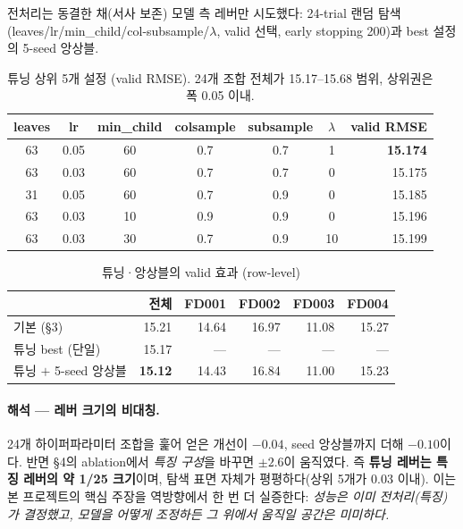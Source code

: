 \documentclass[11pt]{article}
\begin{document}
전처리는 동결한 채(서사 보존) 모델 측 레버만 시도했다:
24-trial 랜덤 탐색(leaves/lr/min\_child/col-subsample/$\lambda$, valid 선택, early stopping 200)과 best 설정의 5-seed 앙상블.

\begin{table}[H]
\centering
\caption{튜닝 상위 5개 설정 (valid RMSE). 24개 조합 전체가 15.17--15.68 범위, 상위권은 폭 0.05 이내.}
\label{tab:tune}
\begin{tabular}{cccccc r}
\toprule
leaves & lr & min\_child & colsample & subsample & $\lambda$ & valid RMSE \\
\midrule
63 & 0.05 & 60 & 0.7 & 0.7 & 1  & \textbf{15.174} \\
63 & 0.03 & 60 & 0.7 & 0.7 & 0  & 15.175 \\
31 & 0.05 & 60 & 0.7 & 0.9 & 0  & 15.185 \\
63 & 0.03 & 10 & 0.9 & 0.9 & 0  & 15.196 \\
63 & 0.03 & 30 & 0.7 & 0.9 & 10 & 15.199 \\
\bottomrule
\end{tabular}
\end{table}

\begin{table}[H]
\centering
\caption{튜닝·앙상블의 valid 효과 (row-level)}
\label{tab:tuneens}
\begin{tabular}{lrrrrr}
\toprule
 & 전체 & FD001 & FD002 & FD003 & FD004 \\
\midrule
기본 (\S3) & 15.21 & 14.64 & 16.97 & 11.08 & 15.27 \\
튜닝 best (단일) & 15.17 & — & — & — & — \\
튜닝 $+$ 5-seed 앙상블 & \textbf{15.12} & 14.43 & 16.84 & 11.00 & 15.23 \\
\bottomrule
\end{tabular}
\end{table}

\paragraph{해석 — 레버 크기의 비대칭.}
24개 하이퍼파라미터 조합을 훑어 얻은 개선이 $-0.04$, seed 앙상블까지 더해 $-0.10$이다.
반면 \S4의 ablation에서 \emph{특징 구성}을 바꾸면 $\pm2.6$이 움직였다.
즉 \textbf{튜닝 레버는 특징 레버의 약 1/25 크기}이며, 탐색 표면 자체가 평평하다(상위 5개가 0.03 이내).
이는 본 프로젝트의 핵심 주장을 역방향에서 한 번 더 실증한다:
\emph{성능은 이미 전처리(특징)가 결정했고, 모델을 어떻게 조정하든 그 위에서 움직일 공간은 미미하다.}
\end{document}
